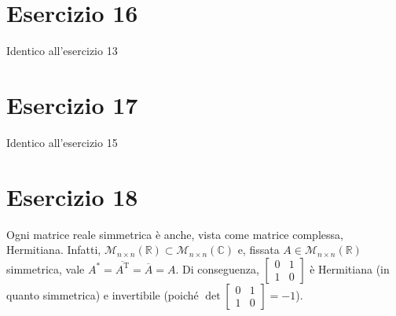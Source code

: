 \documentclass{article}
\newcommand*{\M}[3]{\mathcal{M}_{#1\times#2} \left(#3\right)}
\newcommand*{\MR}[2]{\M{#1}{#2}{\mathbb{R}}}
\newcommand*{\MC}[2]{\M{#1}{#2}{\mathbb{C}}}
\newcommand*{\T}[1]{{#1}^\text{T}}  %
\begin{document}
\section*{Esercizio 16}
Identico all'esercizio 13

\section*{Esercizio 17}
Identico all'esercizio 15

\section*{Esercizio 18}
Ogni matrice reale simmetrica è anche, vista come matrice complessa, Hermitiana.
Infatti, $\MR{n}{n}\subset\MC{n}{n}$ e,
fissata $A\in\MR{n}{n}$ simmetrica, vale
$A^* = \overline{\T{A}} = \overline{A} = A$.
Di conseguenza, $\begin{bmatrix} 0 & 1 \\ 1 & 0 \end{bmatrix}$ è
Hermitiana (in quanto simmetrica) e invertibile
(poiché $\det\begin{bmatrix} 0 & 1 \\ 1 & 0 \end{bmatrix} = -1$).
\end{document}
